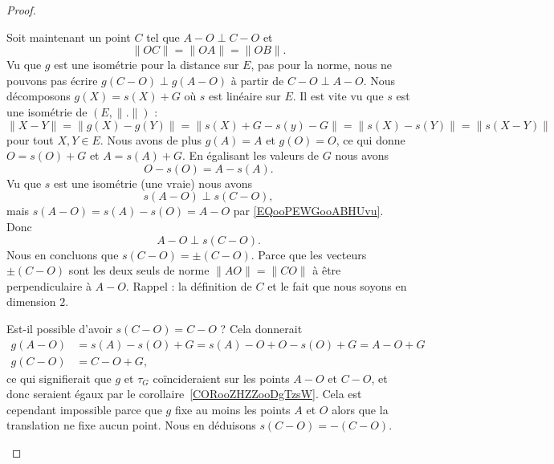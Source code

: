 \begin{proof}
\begin{subproof}
\begin{subproof}
            Soit maintenant un point \( C\) tel que \( A-O\perp C-O\) et
            \begin{equation}
                \| OC \|=\| OA \|=\| OB \|.
            \end{equation}
            Vu que \( g\) est une isométrie pour la distance sur \( E\), pas pour la norme, nous ne pouvons pas écrire \( g(C-O)\perp g(A-O)\) à partir de \( C-O\perp A-O\). Nous décomposons \( g(X)=s(X)+G\) où \( s\) est linéaire sur \( E\). Il est vite vu que \( s\) est une isométrie de \( (E,\| . \|)\) :
            \begin{equation}
                \| X-Y \|=\| g(X)-g(Y) \|=\| s(X)+G-s(y)-G \|=\| s(X)-s(Y) \|=\| s(X-Y) \|
            \end{equation}
            pour tout \( X,Y\in E\). Nous avons de plus \( g(A)=A\) et \( g(O)=O\), ce qui donne \( O=s(O)+G\) et \( A=s(A)+G\). En égalisant les valeurs de \( G\) nous avons
            \begin{equation}        \label{EQooPEWGooABHUvu}
                O-s(O)=A-s(A).
            \end{equation}
            Vu que \( s\) est une isométrie (une vraie) nous avons
            \begin{equation}
                s(A-O)\perp s(C-O),
            \end{equation}
            mais \( s(A-O)=s(A)-s(O)=A-O\) par \eqref{EQooPEWGooABHUvu}. Donc
            \begin{equation}
                A-O\perp s(C-O).
            \end{equation}
            Nous en concluons que \( s(C-O)=\pm (C-O)\). Parce que les vecteurs \( \pm(C-O)\) sont les deux seuls de norme \( \| AO \| =\| CO \|\) à être perpendiculaire à \( A-O\). Rappel : la définition de \( C\) et le fait que nous soyons en dimension \( 2\).

            Est-il possible d'avoir \( s(C-O)=C-O\) ? Cela donnerait
            \begin{subequations}
                \begin{align}
                    g(A-O)&=s(A)-s(O)+G=s(A)-O+O-s(O)+G=A-O+G\\
                    g(C-O)&=C-O+G,
                \end{align}
            \end{subequations}
            ce qui signifierait que \( g\) et \( \tau_G\) coïncideraient sur les points \( A-O\) et \( C-O\), et donc seraient égaux par le corollaire~\ref{CORooZHZZooDgTzsW}. Cela est cependant impossible parce que \( g\) fixe au moins les points \( A\) et \( O\) alors que la translation ne fixe aucun point. Nous en déduisons \( s(C-O)=-(C-O)\).


\end{subproof}
\end{subproof}
\end{proof}
